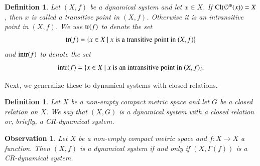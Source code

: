 \documentclass[a4paper,12pt]{article} %
\newcommand{\orbit}{\mathcal{O}^{\oplus}}
\newcommand{\tr}{\textup{tr}}
\newcommand{\intr}{\textup{intr}}
\newtheorem{definition}[theorem]{Definition}
\newtheorem{observation}[theorem]{Observation}
\newcommand{\Cl}  {\mathop{\rm Cl}\nolimits}
\begin{document}
\begin{definition}
Let $(X,f)$ be a dynamical system and let $x\in X$.  If $\Cl(\orbit(x))=X$, then $x$ is called \emph{ \color{blue} a transitive point in $(X,f)$}.  Otherwise it is \emph{ \color{blue} an intransitive point in $(X,f)$}. We use \emph{ \color{blue} $\tr(f)$} to denote the set
$$
\tr(f)=\{x\in X \ | \ x \textup{ is a transitive point in } (X,f)\}
$$
and \emph{ \color{blue} $\intr(f)$} to denote the set
$$
\intr(f)=\{x\in X \ | \ x \textup{ is an intransitive point in } (X,f)\}.
$$
\end{definition}
Next, we generalize these to dynamical systems with closed relations. 
\begin{definition}
Let $X$ be a non-empty compact metric space and let $G$ be a closed relation on $X$. We say that $(X,G)$ is \emph{ \color{blue} a dynamical system with a closed relation} or, briefly, \emph{ \color{blue} a CR-dynamical system}.
\end{definition}
\begin{observation}
Let $X$ be a non-empty compact metric space and $f:X\rightarrow X$ a function.  Then  $(X,f)$ is a dynamical system  if and only if $(X,\Gamma(f))$ is a CR-dynamical system.
\end{observation}
\end{document}

